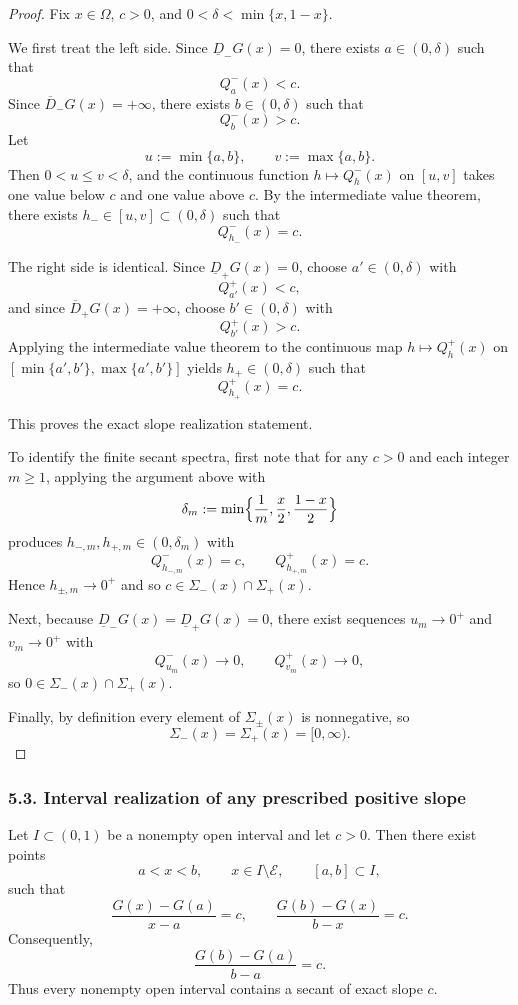 \begin{proof}
Fix $x\in\Omega$, $c>0$, and $0<\delta<\min\{x,1-x\}$.

We first treat the left side. Since $\underline D_-G(x)=0$, there exists $a\in(0,\delta)$ such that
\[
Q_a^-(x)<c.
\]
Since $\overline D_-G(x)=+\infty$, there exists $b\in(0,\delta)$ such that
\[
Q_b^-(x)>c.
\]
Let
\[
u:=\min\{a,b\},\qquad v:=\max\{a,b\}.
\]
Then $0<u\le v<\delta$, and the continuous function $h\mapsto Q_h^-(x)$ on $[u,v]$ takes one value below $c$ and one value above $c$. By the intermediate value theorem, there exists $h_-\in[u,v]\subset(0,\delta)$ such that
\[
Q_{h_-}^-(x)=c.
\]

The right side is identical. Since $\underline D_+G(x)=0$, choose $a'\in(0,\delta)$ with
\[
Q_{a'}^+(x)<c,
\]
and since $\overline D_+G(x)=+\infty$, choose $b'\in(0,\delta)$ with
\[
Q_{b'}^+(x)>c.
\]
Applying the intermediate value theorem to the continuous map $h\mapsto Q_h^+(x)$ on $[\min\{a',b'\},\max\{a',b'\}]$ yields $h_+\in(0,\delta)$ such that
\[
Q_{h_+}^+(x)=c.
\]

This proves the exact slope realization statement.

To identify the finite secant spectra, first note that for any $c>0$ and each integer $m\ge1$, applying the argument above with
\[
\delta_m:=\min\Bigl\{\frac1m,\frac{x}{2},\frac{1-x}{2}\Bigr\}
\]
produces $h_{-,m},h_{+,m}\in(0,\delta_m)$ with
\[
Q_{h_{-,m}}^-(x)=c,
\qquad
Q_{h_{+,m}}^+(x)=c.
\]
Hence $h_{\pm,m}\to0^+$ and so $c\in\Sigma_-(x)\cap\Sigma_+(x)$.

Next, because $\underline D_-G(x)=\underline D_+G(x)=0$, there exist sequences $u_m\to0^+$ and $v_m\to0^+$ with
\[
Q_{u_m}^-(x)\to0,
\qquad
Q_{v_m}^+(x)\to0,
\]
so $0\in\Sigma_-(x)\cap\Sigma_+(x)$.

Finally, by definition every element of $\Sigma_\pm(x)$ is nonnegative, so
\[
\Sigma_-(x)=\Sigma_+(x)=[0,\infty).
\]
\end{proof}


\subsubsection*{5.3. Interval realization of any prescribed positive slope}

\begin{corollary}\label{cor:interval-exact-slope}
Let $I\subset(0,1)$ be a nonempty open interval and let $c>0$. Then there exist points
\[
a<x<b,
\qquad x\in I\setminus\mathcal E,
\qquad [a,b]\subset I,
\]
such that
\[
\frac{G(x)-G(a)}{x-a}=c,
\qquad
\frac{G(b)-G(x)}{b-x}=c.
\]
Consequently,
\[
\frac{G(b)-G(a)}{b-a}=c.
\]
Thus every nonempty open interval contains a secant of exact slope $c$.
\end{corollary}

